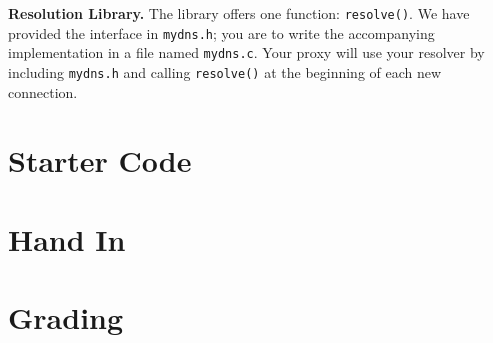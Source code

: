 \documentclass{article}
\begin{document}
\bigskip \noindent \textbf{Resolution Library.} The library offers one
function: \texttt{resolve()}. We have provided the interface in
\texttt{mydns.h}; you are to write the accompanying implementation in a file
named \texttt{mydns.c}. Your proxy will use your resolver by including
\texttt{mydns.h} and calling \texttt{resolve()} at the beginning of each new
connection.


\section{Starter Code}
\label{sec:starter}


\section{Hand In}


\section{Grading}
\end{document}

